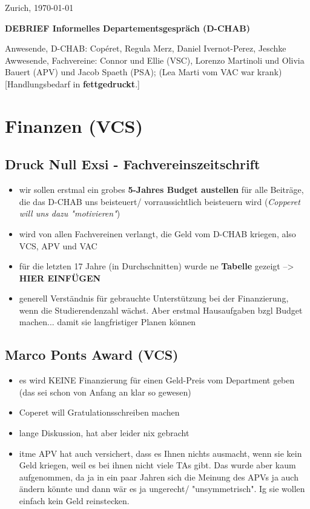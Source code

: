 \documentclass{article}
\begin{document}
\vspace{-0.5cm}
\begin{flushright}
\parbox[r]{4cm}{Zurich, \today}
\end{flushright}

\vspace{0.2cm}
\begin{center}
\textbf{\LARGE{DEBRIEF Informelles Departementsgespräch (D-CHAB)}} \\
\end{center}

Anwesende, D-CHAB: Copéret, Regula Merz, Daniel Ivernot-Perez, Jeschke
Awwesende, Fachvereine: Connor und Ellie (VSC), Lorenzo Martinoli und Olivia Bauert (APV) und Jacob Spaeth (PSA); (Lea Marti vom VAC war krank) 
[Handlungsbedarf in \textbf{fettgedruckt}.]
\section{Finanzen (VCS)}

\subsection{Druck Null Exsi - Fachvereinszeitschrift}
\begin{itemize}
    \item wir sollen erstmal ein grobes \textbf{5-Jahres Budget austellen} für alle Beiträge, die das D-CHAB uns beisteuert/ vorraussichtlich beisteuern wird (\textit{Copperet will uns dazu "motivieren"})
    \item wird von allen Fachvereinen verlangt, die Geld vom D-CHAB kriegen, also VCS, APV und VAC
    \item für die letzten 17 Jahre (in Durchschnitten) wurde ne \textbf{Tabelle} gezeigt --> \textbf{HIER EINFÜGEN}
    \item generell Verständnis für gebrauchte Unterstützung bei der Finanzierung, wenn die Studierendenzahl wächst. Aber erstmal Hausaufgaben bzgl Budget machen... damit sie langfristiger Planen können
\end{itemize}

\subsection{Marco Ponts Award (VCS)}
\begin{itemize}
    \item es wird KEINE Finanzierung für einen Geld-Preis vom Department geben (das sei schon von Anfang an klar so gewesen)
    \item Coperet will Gratulationsschreiben machen
    \item lange Diskussion, hat aber leider nix gebracht
    \item itme APV hat auch versichert, dass es Ihnen nichts ausmacht, wenn sie kein Geld kriegen, weil es bei ihnen nicht viele TAs gibt. Das wurde aber kaum aufgenommen, da ja in ein paar Jahren sich die Meinung des APVs ja auch ändern könnte und dann wär es ja ungerecht/ "unsymmetrisch". Ig sie wollen einfach kein Geld reinstecken.
\end{itemize}
\end{document}
